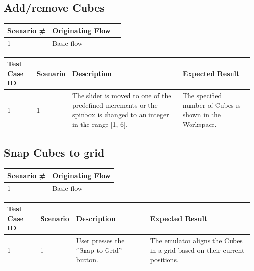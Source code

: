 \documentclass[12pt]{article}
\begin{document}
\clearpage

\subsection{Add/remove Cubes}

\begin{table}[h!]
  \begin{tabular}{l | l | l}
    \textbf{Scenario \#} &
    \textbf{Originating Flow} \\ \hline

    1 &
    Basic flow &
    \\ \hline

  \end{tabular}
\end{table}

\begin{table}[h!]
  \begin{tabular}{p{.5in} | p{.75in} | p{2.15in} | p{2.15in}}
    \textbf{Test Case ID} &
    \textbf{Scenario} &
    \textbf{Description} &
    \textbf{Expected Result} \\ \hline

    1 &
    1 &
    The slider is moved to one of the predefined increments or the spinbox is changed to an integer in the range [1, 6]. &
    The specified number of Cubes is shown in the Workspace. \\ \hline

  \end{tabular}
\end{table}

\subsection{Snap Cubes to grid}

\begin{table}[h!]
  \begin{tabular}{l | l}
    \textbf{Scenario \#} &
    \textbf{Originating Flow} \\ \hline

    1 &
    Basic flow \\ \hline

  \end{tabular}
\end{table}

\begin{table}[h!]
  \begin{tabular}{p{.5in} | p{.75in} | p{2.15in} | p{2.15in}}
    \textbf{Test Case ID} &
    \textbf{Scenario} &
    \textbf{Description} &
    \textbf{Expected Result} \\ \hline

    1 &
    1 &
    User presses the ``Snap to Grid'' button. &
    The emulator aligns the Cubes in a grid based on their current positions.  \\ \hline

  \end{tabular}
\end{table}
\end{document}
